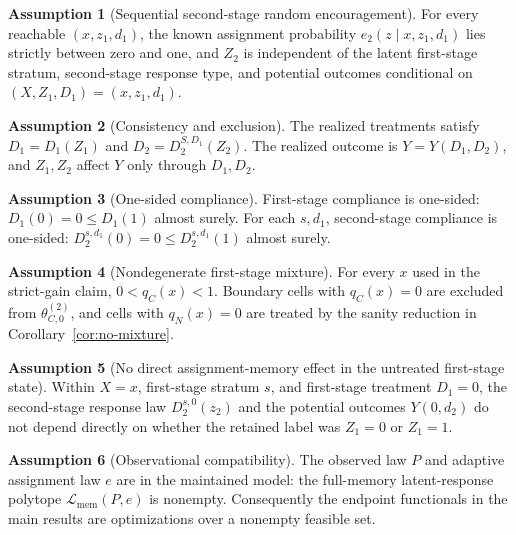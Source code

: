 \documentclass[11pt]{article}
\theoremstyle{definition}
\newtheorem{assumption}{Assumption}
\theoremstyle{plain}
\theoremstyle{remark}
\begin{document}
\begin{assumption}[Sequential second-stage random encouragement]\label{ass:second-rand}
For every reachable \((x,z_1,d_1)\), the known assignment probability \(e_2(z\mid x,z_1,d_1)\) lies strictly between zero and one, and \(Z_2\) is independent of the latent first-stage stratum, second-stage response type, and potential outcomes conditional on \((X,Z_1,D_1)=(x,z_1,d_1)\).
\end{assumption}

\begin{assumption}[Consistency and exclusion]\label{ass:consistency}
The realized treatments satisfy \(D_1=D_1(Z_1)\) and \(D_2=D_2^{S,D_1}(Z_2)\).  The realized outcome is \(Y=Y(D_1,D_2)\), and \(Z_1,Z_2\) affect \(Y\) only through \(D_1,D_2\).
\end{assumption}

\begin{assumption}[One-sided compliance]\label{ass:one-sided}
First-stage compliance is one-sided: \(D_1(0)=0\le D_1(1)\) almost surely.  For each \(s,d_1\), second-stage compliance is one-sided: \(D_2^{s,d_1}(0)=0\le D_2^{s,d_1}(1)\) almost surely.
\end{assumption}

\begin{assumption}[Nondegenerate first-stage mixture]\label{ass:nondegenerate}
For every \(x\) used in the strict-gain claim, \(0<q_C(x)<1\).  Boundary cells with \(q_C(x)=0\) are excluded from \(\theta_{C,0}^{(2)}\), and cells with \(q_N(x)=0\) are treated by the sanity reduction in Corollary~\ref{cor:no-mixture}.
\end{assumption}

\begin{assumption}[No direct assignment-memory effect in the untreated first-stage state]\label{ass:no-memory-direct}
Within \(X=x\), first-stage stratum \(s\), and first-stage treatment \(D_1=0\), the second-stage response law \(D_2^{s,0}(z_2)\) and the potential outcomes \(Y(0,d_2)\) do not depend directly on whether the retained label was \(Z_1=0\) or \(Z_1=1\).
\end{assumption}

\begin{assumption}[Observational compatibility]\label{ass:compatible}
The observed law \(P\) and adaptive assignment law \(e\) are in the maintained
model: the full-memory latent-response polytope
\(\mathcal{L}_{\mathrm{mem}}(P,e)\) is nonempty.  Consequently the endpoint
functionals in the main results are optimizations over a nonempty feasible set.
\end{assumption}
\end{document}
